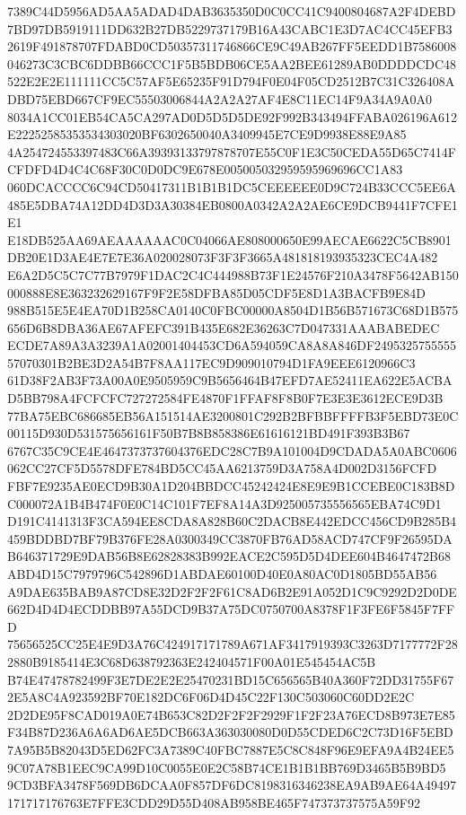 \documentclass[UTF8,fontset=fandol,zihao=-4,a4paper]{ctexart}
\begin{document}
{{7389C44D5956AD5AA5ADAD4DAB3635350D0C0CC41C9400804687A2F4DEBD7BD97DB5919111DD632B27DB5229737179B16A43CABC1E3D7AC4CC45EFB3
2619F491878707FDABD0CD50357311746866CE9C49AB267FF5EEDD1B7586008046273C3CBC6DDBB66CCC1F5B5BDB06CE5AA2BEE61289AB0DDDDCDC48
522E2E2E111111CC5C57AF5E65235F91D794F0E04F05CD2512B7C31C326408ADBD75EBD667CF9EC55503006844A2A2A27AF4E8C11EC14F9A34A9A0A0
8034A1CC01EB54CA5CA297AD0D5D5D5DE92F992B343494FFABA026196A612E22252585353534303020BF6302650040A3409945E7CE9D9938E88E9A85
4A254724553397483C66A39393133797878707E55C0F1E3C50CEDA55D65C7414FCFDFD4D4C4C68F30C0D0DC9E678E005005032959595969696CC1A83
060DCACCCC6C94CD50417311B1B1B1DC5CEEEEEE0D9C724B33CCC5EE6A485E5DBA74A12DD4D3D3A30384EB0800A0342A2A2AE6CE9DCB9441F7CFE1E1
E18DB525AA69AEAAAAAAC0C04066AE808000650E99AECAE6622C5CB8901DB20E1D3AE4E7E7E36A020028073F3F3F3665A481818193935323CEC4A482
E6A2D5C5C7C77B7979F1DAC2C4C444988B73F1E24576F210A3478F5642AB150000888E8E363232629167F9F2E58DFBA85D05CDF5E8D1A3BACFB9E84D
988B515E5E4EA70D1B258CA0140C0FBC00000A8504D1B56B571673C68D1B575656D6B8DBA36AE67AFEFC391B435E682E36263C7D047331AAABABEDEC
ECDE7A89A3A3239A1A02001404453CD6A594059CA8A8A846DF249532575555557070301B2BE3D2A54B7F8AA117EC9D909010794D1FA9EEE6120966C3
61D38F2AB3F73A00A0E9505959C9B5656464B47EFD7AE52411EA622E5ACBAD5BB798A4FCFCFC727272584FE4870F1FFAF8F8B0F7E3E3E3612ECE9D3B
77BA75EBC686685EB56A151514AE3200801C292B2BFBBFFFFB3F5EBD73E0C00115D930D531575656161F50B7B8B858386E61616121BD491F393B3B67
6767C35C9CE4E4647373737604376EDC28C7B9A101004D9CDADA5A0ABC0606062CC27CF5D5578DFE784BD5CC45AA6213759D3A758A4D002D3156FCFD
FBF7E9235AE0ECD9B30A1D204BBDCC45242424E8E9E9B1CCEBE0C183B8DC000072A1B4B474F0E0C14C101F7EF8A14A3D925005735556565EBA74C9D1
D191C4141313F3CA594EE8CDA8A828B60C2DACB8E442EDCC456CD9B285B4459BDDBD7BF79B376FE28A0300349CC3870FB76AD58ACD747CF9F26595DA
B646371729E9DAB56B8E62828383B992EACE2C595D5D4DEE604B4647472B68ABD4D15C7979796C542896D1ABDAE60100D40E0A80AC0D1805BD55AB56
A9DAE635BAB9A87CD8E32D2F2F2F61C8AD6B2E91A052D1C9C9292D2D0DE662D4D4D4ECDDBB97A55DCD9B37A75DC0750700A8378F1F3FE6F5845F7FFD
75656525CC25E4E9D3A76C424917171789A671AF3417919393C3263D7177772F282880B9185414E3C68D638792363E242404571F00A01E545454AC5B
B74E47478782499F3E7DE2E2E25470231BD15C656565B40A360F72DD31755F672E5A8C4A923592BF70E182DC6F06D4D45C22F130C503060C60DD2E2C
2D2DE95F8CAD019A0E74B653C82D2F2F2F2929F1F2F23A76ECD8B973E7E85F34B87D236A6A6AD6AE5DCB663A363030080D0D55CDED6C2C73D16F5EBD
7A95B5B82043D5ED62FC3A7389C40FBC7887E5C8C848F96E9EFA9A4B24EE59C07A78B1EEC9CA99D10C0055E0E2C58B74CE1B1B1BB769D3465B5B9BD5
9CD3BFA3478F569DB6DCAA0F857DF6DC8198316346238EA9AB9AE64A49497171717176763E7FFE3CDD29D55D408AB958BE465F747373737575A59F92
}}
\end{document}
